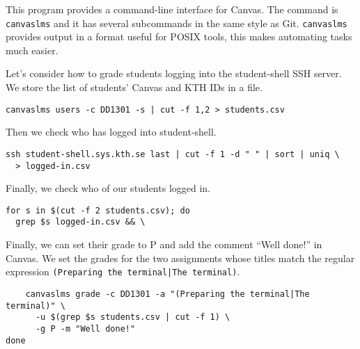 
This program provides a command-line interface for Canvas.
The command is \texttt{canvaslms} and it has several subcommands in the same 
style as Git.
\texttt{canvaslms} provides output in a format useful for POSIX tools, this 
makes automating tasks much easier.

Let's consider how to grade students logging into the student-shell SSH server.
We store the list of students' Canvas and KTH IDs in a file.
\begin{verbatim}
canvaslms users -c DD1301 -s | cut -f 1,2 > students.csv
\end{verbatim}
Then we check who has logged into student-shell.
\begin{verbatim}
ssh student-shell.sys.kth.se last | cut -f 1 -d " " | sort | uniq \
  > logged-in.csv
\end{verbatim}
Finally, we check who of our students logged in.
\begin{verbatim}
for s in $(cut -f 2 students.csv); do
  grep $s logged-in.csv && \
\end{verbatim}
Finally, we can set their grade to P and add the comment \enquote{Well done!} 
in Canvas.
We set the grades for the two assignments whose titles match the regular 
expression \texttt{(Preparing the terminal|The terminal)}.
\begin{verbatim}
    canvaslms grade -c DD1301 -a "(Preparing the terminal|The terminal)" \
      -u $(grep $s students.csv | cut -f 1) \
      -g P -m "Well done!"
done
\end{verbatim}


